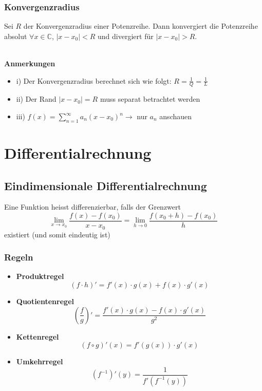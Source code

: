 \documentclass[8pt, a4paper, landscape, fleqn]{scrartcl}
\newenvironment {annotation}[1]
				{\begin{itshape} \begin{small} \textbf{#1} \begin{itemize}}
				{\end{itemize} \end{small} \end{itshape}}
\begin{document}
\begin{multicols*}{3}
				\subsubsection{Konvergenzradius}
					Sei $R$ der Konvergenzradius einer Potenzreihe. Dann konvergiert die Potenzreihe absolut $\forall x \in \mathbb{C}$, $\vert x-x_0 \vert < R$ und divergiert für $\vert x-x_0 \vert > R$.\\\\
					\begin{annotation}{Anmerkungen}
						\item[i)] Der Konvergenzradius berechnet sich wie folgt: $R=\frac{1}{Q} = \frac{1}{L}$
						\item[ii)] Der Rand $\vert x-x_0 \vert = R$ muss separat betrachtet werden
						\item[iii)] $f(x)=\sum_{n=1}^{\infty}a_n(x-x_0)^n \rightarrow$  nur $a_n$ anschauen
					\end{annotation}
		
		\section{Differentialrechnung}
			\subsection{Eindimensionale Differentialrechnung}
				Eine Funktion heisst differenzierbar, falls der Grenzwert
				\begin{equation*}
					\lim_{x\rightarrow x_0} \frac{f(x)-f(x_0)}{x-x_0}=\lim_{h \rightarrow 0} \frac{f(x_0+h)-f(x_0)}{h}
				\end{equation*}
				existiert (und somit eindeutig ist)
				\subsubsection{Regeln}
					\begin{itemize}
						\item \textbf{Produktregel} \[(f \cdot h)'=f'(x) \cdot g(x)+f(x) \cdot g'(x)\]
						\item \textbf{Quotientenregel} \[\left(\frac{f}{g}\right)'=\frac{f'(x) \cdot g(x)-f(x) \cdot g'(x)}{g^2}\]
						\item \textbf{Kettenregel}
						\[\left(f \circ g\right)'(x)= f'(g(x)) \cdot g'(x)\]
						\item \textbf{Umkehrregel}
						\[\left(f^{-1}\right)'(y)=\frac{1}{f'\left(f^{-1}(y) \right)}\]
					\end{itemize}

\end{multicols*}
\end{document}

